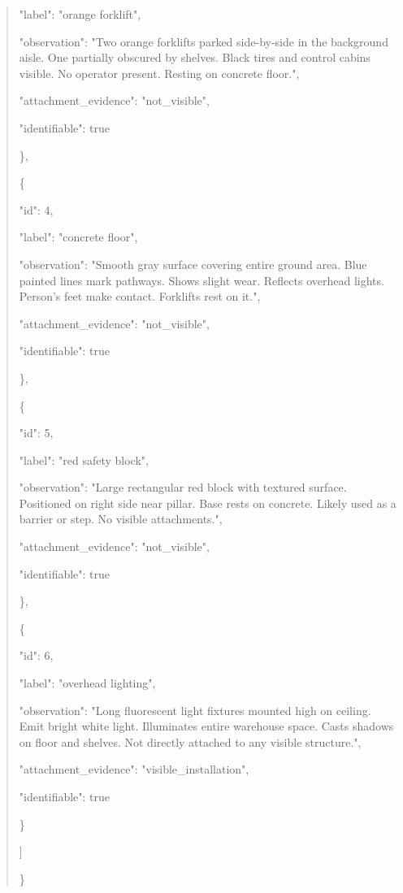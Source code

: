 \documentclass[10pt,a4paper]{article}
\begin{document}
\begin{quote}
      "label":\allowbreak{} "orange forklift",\allowbreak{}\par
      "observation":\allowbreak{} "Two orange forklifts parked side-by-side in the background aisle. One partially obscured by shelves. Black tires and control cabins visible. No operator present. Resting on concrete floor.",\allowbreak{}\par
      "attachment\_evidence":\allowbreak{} "not\_visible",\allowbreak{}\par
      "identifiable":\allowbreak{} true\par
    \},\allowbreak{}\par
    \{\par
      "id":\allowbreak{} 4,\allowbreak{}\par
      "label":\allowbreak{} "concrete floor",\allowbreak{}\par
      "observation":\allowbreak{} "Smooth gray surface covering entire ground area. Blue painted lines mark pathways. Shows slight wear. Reflects overhead lights. Person's feet make contact. Forklifts rest on it.",\allowbreak{}\par
      "attachment\_evidence":\allowbreak{} "not\_visible",\allowbreak{}\par
      "identifiable":\allowbreak{} true\par
    \},\allowbreak{}\par
    \{\par
      "id":\allowbreak{} 5,\allowbreak{}\par
      "label":\allowbreak{} "red safety block",\allowbreak{}\par
      "observation":\allowbreak{} "Large rectangular red block with textured surface. Positioned on right side near pillar. Base rests on concrete. Likely used as a barrier or step. No visible attachments.",\allowbreak{}\par
      "attachment\_evidence":\allowbreak{} "not\_visible",\allowbreak{}\par
      "identifiable":\allowbreak{} true\par
    \},\allowbreak{}\par
    \{\par
      "id":\allowbreak{} 6,\allowbreak{}\par
      "label":\allowbreak{} "overhead lighting",\allowbreak{}\par
      "observation":\allowbreak{} "Long fluorescent light fixtures mounted high on ceiling. Emit bright white light. Illuminates entire warehouse space. Casts shadows on floor and shelves. Not directly attached to any visible structure.",\allowbreak{}\par
      "attachment\_evidence":\allowbreak{} "visible\_installation",\allowbreak{}\par
      "identifiable":\allowbreak{} true\par
    \}\par
  ]\par
\}
\end{quote}
\end{document}
